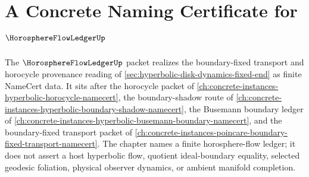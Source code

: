 \chapter{A Concrete Naming Certificate for $\HorosphereFlowLedgerUp$}
\label{ch:concrete-instances-horosphere-flow-ledger-namecert}

The $\HorosphereFlowLedgerUp$ packet realizes the boundary-fixed transport and horocycle provenance reading of \autoref{sec:hyperbolic-disk-dynamics-fixed-end} as finite NameCert data. It sits after the horocycle packet of \autoref{ch:concrete-instances-hyperbolic-horocycle-namecert}, the boundary-shadow route of \autoref{ch:concrete-instances-hyperbolic-boundary-shadow-namecert}, the Busemann boundary ledger of \autoref{ch:concrete-instances-hyperbolic-busemann-boundary-namecert}, and the boundary-fixed transport packet of \autoref{ch:concrete-instances-poincare-boundary-fixed-transport-namecert}. The chapter names a finite horosphere-flow ledger; it does not assert a host hyperbolic flow, quotient ideal-boundary equality, selected geodesic foliation, physical observer dynamics, or ambient manifold completion.

